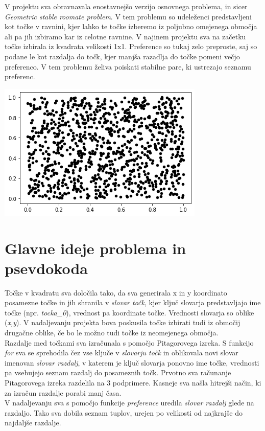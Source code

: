 \documentclass[12pt, a4paper]{article}
\begin{document}
V projektu  sva obravnavala enostavnejšo verzijo osnovnega problema, in sicer \textit{Geometric stable roomate problem}. V tem problemu so udeleženci predstavljeni kot točke v ravnini, kjer lahko te točke izberemo iz poljubno omejenega območja ali pa jih izbiramo kar iz celotne ravnine. V najinem projektu sva na začetku točke izbirala iz kvadrata velikosti 1x1. Preference so tukaj zelo preproste, saj so podane le kot razdalja do točk, kjer manjša razadlja do točke pomeni večjo preferenco. V tem problemu želiva poiskati stabilne pare, ki ustrezajo seznamu preferenc. \\

\begin{center}
\includegraphics{rdece_tocke.png}
\end{center}


\section{Glavne ideje problema in psevdokoda}
Točke v kvadratu sva določila tako, da sva generirala x in y koordinato posamezne točke in jih shranila v \textit{slovar točk}, kjer ključ slovarja predstavljajo ime točke (npr. \textit{tocka_0}), vrednost pa koordinate točke. Vrednosti slovarja so oblike (\textit{x,y}). V nadaljevanju projekta bova poskusila točke izbirati tudi iz območij drugačne oblike, če bo le možno tudi točke iz neomejenega območja.\\

Razdalje med točkami sva izračunala s pomočjo Pitagorovega izreka. S funkcijo \textit{for} sva se sprehodila čez vse ključe v \textit{slovarju točk} in oblikovala novi slovar imenovan \textit{slovar razdalj}, v katerem je ključ slovarja ponovno ime točke, vrednosti pa vsebujejo seznam razdalj do posameznih točk. Prvotno sva računanje Pitagorovega izreka  razdelila na 3 podprimere. Kasneje sva našla hitrejši način, ki za izračun razdalje porabi manj časa.\\
V nadaljevanju sva s pomočjo funkcije \textit{preference} uredila \textit{slovar razdalj} glede na razdaljo. Tako sva dobila seznam tuplov, urejen po velikosti od najkrajše do najdaljše razdalje.  \\
\end{document}
